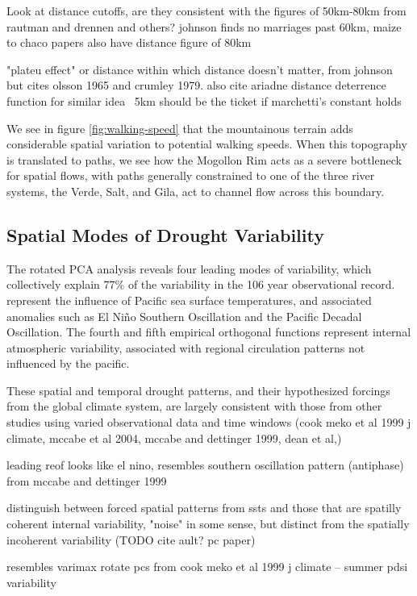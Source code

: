 \documentclass[fleqn,10pt]{wlscirep}
\begin{document}
Look at distance cutoffs, are they consistent with the figures of 50km-80km from rautman and drennen and others? johnson finds no marriages past 60km, maize to chaco papers also have distance figure of 80km

"plateu effect" or distance within which distance doesn't matter, from johnson but cites olsson 1965 and crumley 1979. also cite ariadne distance deterrence function for similar idea
~5km should be the ticket if marchetti's constant holds

We see in figure \ref{fig:walking-speed} that the mountainous terrain adds considerable spatial variation to potential walking speeds. When this topography is translated to paths, we see how the Mogollon Rim acts as a severe bottleneck for spatial flows, with paths generally constrained to one of the three river systems, the Verde, Salt, and Gila, act to channel flow across this boundary.  

\subsection*{Spatial Modes of Drought Variability}

The rotated PCA analysis reveals four leading modes of variability, which collectively explain 77\% of the variability in the 106 year observational record. represent the influence of Pacific sea surface temperatures, and associated anomalies such as El Ni\~no Southern Oscillation and the Pacific Decadal Oscillation. The fourth and fifth empirical orthogonal functions represent internal atmospheric variability, associated with regional circulation patterns not influenced by the pacific.

These spatial and temporal drought patterns, and their hypothesized forcings from the global climate system, are largely consistent with those from other studies using varied observational data and time windows (cook meko et al 1999 j climate, mccabe et al 2004, mccabe and dettinger 1999, dean et al,)

leading reof looks like el nino, resembles southern oscillation pattern (antiphase) from mccabe and dettinger 1999

distinguish between forced spatial patterns from ssts and those that are spatilly coherent internal variability, "noise" in some sense, but distinct from the spatially incoherent variability (TODO cite ault? pc paper)


resembles varimax rotate pcs from cook meko et al 1999 j climate -- summer pdsi variability
\end{document}
